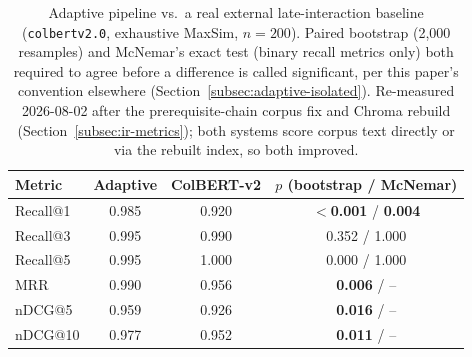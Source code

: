 \documentclass[a4paper,twoside]{article}
\begin{document}
\begin{table}[t]
\caption{Adaptive pipeline vs.\ a real external late-interaction baseline (\texttt{colbertv2.0}, exhaustive MaxSim, $n=200$). Paired bootstrap (2,000 resamples) and McNemar's exact test (binary recall metrics only) both required to agree before a difference is called significant, per this paper's convention elsewhere (Section~\ref{subsec:adaptive-isolated}). Re-measured 2026-08-02 after the prerequisite-chain corpus fix and Chroma rebuild (Section~\ref{subsec:ir-metrics}); both systems score corpus text directly or via the rebuilt index, so both improved.}\label{tab:colbert-baseline} \centering
\begin{tabular}{|l|c|c|c|}
\hline
Metric & Adaptive & ColBERT-v2 & $p$ (bootstrap / McNemar) \\
\hline
Recall@1 & 0.985 & 0.920 & \textbf{$<$0.001} / \textbf{0.004} \\
Recall@3 & 0.995 & 0.990 & 0.352 / 1.000 \\
Recall@5 & 0.995 & 1.000 & 0.000 / 1.000 \\
MRR & 0.990 & 0.956 & \textbf{0.006} / -- \\
nDCG@5 & 0.959 & 0.926 & \textbf{0.016} / -- \\
nDCG@10 & 0.977 & 0.952 & \textbf{0.011} / -- \\
\hline
\end{tabular}
\end{table}
\end{document}
